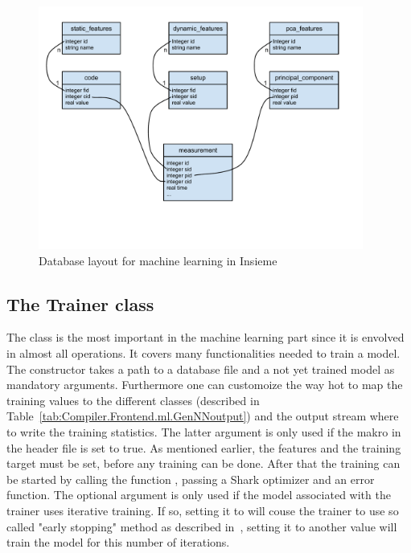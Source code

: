 \begin{figure}[tb]
	\centering
	\includegraphics[width=0.95\textwidth, trim={0 4cm 0 0}]{pics/compiler/machine_learning/ml_db_schema}
	\caption{Database layout for machine learning in Insieme}
	\label{fig:Compiler.Frontend.ml.dbLayout}
\end{figure}

\subsection{The Trainer class}

The class  is the most important in the machine learning part since it is envolved in almost all operations. It covers many functionalities needed to train a model. The constructor takes a path to a database file and a not yet trained model as mandatory arguments. Furthermore one can customoize the way hot to map the training values to the different classes (described in Table~\ref{tab:Compiler.Frontend.ml.GenNNoutput}) and the output stream where to write the training statistics. The latter argument is only used if the makro  in the header file  is set to true. As mentioned earlier, the features and the training target must be set, before any training can be done. After that the training can be started by calling the function , passing a Shark optimizer and an error function. The optional argument  is only used if the model associated with the trainer uses iterative training. If so, setting it to  will couse the trainer to use so called "early stopping" method as described in~\cite{bishop}, setting it to another value will train the model for this number of iterations.

